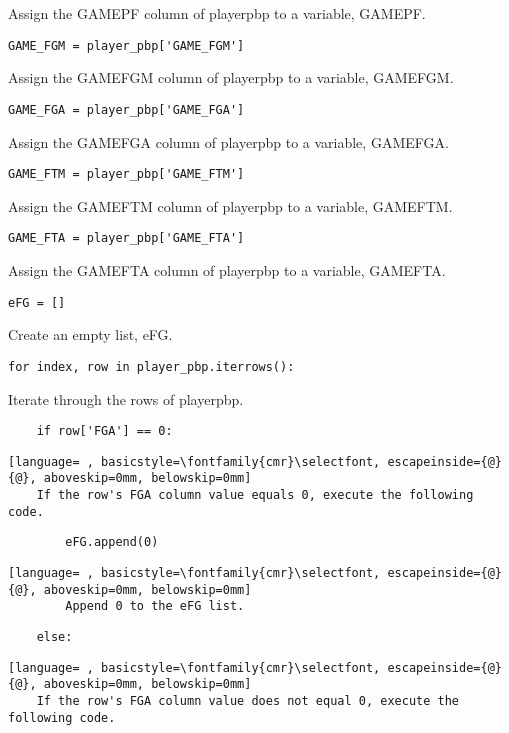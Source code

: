 \documentclass{article}
\begin{document}
Assign the GAME\textunderscore PF column of player\textunderscore pbp to a variable, GAME\textunderscore PF.
\begin{lstlisting}
GAME_FGM = player_pbp['GAME_FGM']
\end{lstlisting}
Assign the GAME\textunderscore FGM column of player\textunderscore pbp to a variable, GAME\textunderscore FGM.
\begin{lstlisting}
GAME_FGA = player_pbp['GAME_FGA']
\end{lstlisting}
Assign the GAME\textunderscore FGA column of player\textunderscore pbp to a variable, GAME\textunderscore FGA.
\begin{lstlisting}
GAME_FTM = player_pbp['GAME_FTM']
\end{lstlisting}
Assign the GAME\textunderscore FTM column of player\textunderscore pbp to a variable, GAME\textunderscore FTM.
\begin{lstlisting}
GAME_FTA = player_pbp['GAME_FTA']
\end{lstlisting}
Assign the GAME\textunderscore FTA column of player\textunderscore pbp to a variable, GAME\textunderscore FTA.
\begin{lstlisting}
eFG = []
\end{lstlisting}
Create an empty list, eFG.
\begin{lstlisting}
for index, row in player_pbp.iterrows():
\end{lstlisting}
Iterate through the rows of player\textunderscore pbp.
\begin{lstlisting}
    if row['FGA'] == 0:
\end{lstlisting}
\begin{lstlisting}[language= , basicstyle=\fontfamily{cmr}\selectfont, escapeinside={@}{@}, aboveskip=0mm, belowskip=0mm]
    If the row's FGA column value equals 0, execute the following code.
\end{lstlisting}
\begin{lstlisting}
        eFG.append(0)
\end{lstlisting}
\begin{lstlisting}[language= , basicstyle=\fontfamily{cmr}\selectfont, escapeinside={@}{@}, aboveskip=0mm, belowskip=0mm]
        Append 0 to the eFG list.
\end{lstlisting}
\begin{lstlisting}
    else:
\end{lstlisting}
\begin{lstlisting}[language= , basicstyle=\fontfamily{cmr}\selectfont, escapeinside={@}{@}, aboveskip=0mm, belowskip=0mm]
    If the row's FGA column value does not equal 0, execute the following code.
\end{lstlisting}
\end{document}
